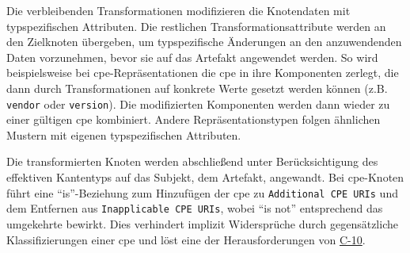 Die verbleibenden Transformationen modifizieren die Knotendaten mit typspezifischen Attributen.
Die restlichen Transformationsattribute werden an den Zielknoten übergeben, um typspezifische Änderungen an den anzuwendenden Daten vorzunehmen, bevor sie auf das Artefakt angewendet werden.
So wird beispielsweise bei \acrshort{cpe}-Repräsentationen die \acrshort{cpe} in ihre Komponenten zerlegt, die dann durch Transformationen auf konkrete Werte gesetzt werden können (z.B. \texttt{vendor} oder \texttt{version}).
Die modifizierten Komponenten werden dann wieder zu einer gültigen \acrshort{cpe} kombiniert.
Andere Repräsentationstypen folgen ähnlichen Mustern mit eigenen typspezifischen Attributen.

Die transformierten Knoten werden abschließend unter Berücksichtigung des effektiven Kantentyps auf das Subjekt, dem Artefakt, angewandt.
Bei \acrshort{cpe}-Knoten führt eine \enquote{is}-Beziehung zum Hinzufügen der \acrshort{cpe} zu \texttt{Additional CPE URIs} und dem Entfernen aus \texttt{Inapplicable CPE URIs}, wobei \enquote{is not} entsprechend das umgekehrte bewirkt.
Dies verhindert implizit Widersprüche durch gegensätzliche Klassifizierungen einer \acrshort{cpe} und löst eine der Herausforderungen von \hyperref[subsec:c-10-order-dependency]{C-10}.
